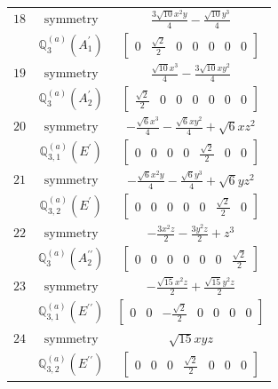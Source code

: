 \documentclass[fleqn,8pt,landscape]{jsarticle}
\begin{document}
\begin{longtable}{ccc}
$ 18 $ & $ \text{symmetry} $ & $ \frac{3 \sqrt{10} x^{2} y}{4} - \frac{\sqrt{10} y^{3}}{4} $ \\
$  $ & $ \mathbb{Q}_{3}^{(a)}(A_{1}^{\prime}) $ & $ \begin{bmatrix} 0 & \frac{\sqrt{2}}{2} & 0 & 0 & 0 & 0 & 0 \end{bmatrix} $ \\ \hline
$ 19 $ & $ \text{symmetry} $ & $ \frac{\sqrt{10} x^{3}}{4} - \frac{3 \sqrt{10} x y^{2}}{4} $ \\
$  $ & $ \mathbb{Q}_{3}^{(a)}(A_{2}^{\prime}) $ & $ \begin{bmatrix} \frac{\sqrt{2}}{2} & 0 & 0 & 0 & 0 & 0 & 0 \end{bmatrix} $ \\ \hline
$ 20 $ & $ \text{symmetry} $ & $ - \frac{\sqrt{6} x^{3}}{4} - \frac{\sqrt{6} x y^{2}}{4} + \sqrt{6} x z^{2} $ \\
$  $ & $ \mathbb{Q}_{3,1}^{(a)}(E^{\prime}) $ & $ \begin{bmatrix} 0 & 0 & 0 & 0 & \frac{\sqrt{2}}{2} & 0 & 0 \end{bmatrix} $ \\ \hline
$ 21 $ & $ \text{symmetry} $ & $ - \frac{\sqrt{6} x^{2} y}{4} - \frac{\sqrt{6} y^{3}}{4} + \sqrt{6} y z^{2} $ \\
$  $ & $ \mathbb{Q}_{3,2}^{(a)}(E^{\prime}) $ & $ \begin{bmatrix} 0 & 0 & 0 & 0 & 0 & \frac{\sqrt{2}}{2} & 0 \end{bmatrix} $ \\ \hline
$ 22 $ & $ \text{symmetry} $ & $ - \frac{3 x^{2} z}{2} - \frac{3 y^{2} z}{2} + z^{3} $ \\
$  $ & $ \mathbb{Q}_{3}^{(a)}(A_{2}^{\prime\prime}) $ & $ \begin{bmatrix} 0 & 0 & 0 & 0 & 0 & 0 & \frac{\sqrt{2}}{2} \end{bmatrix} $ \\ \hline
$ 23 $ & $ \text{symmetry} $ & $ - \frac{\sqrt{15} x^{2} z}{2} + \frac{\sqrt{15} y^{2} z}{2} $ \\
$  $ & $ \mathbb{Q}_{3,1}^{(a)}(E^{\prime\prime}) $ & $ \begin{bmatrix} 0 & 0 & - \frac{\sqrt{2}}{2} & 0 & 0 & 0 & 0 \end{bmatrix} $ \\ \hline
$ 24 $ & $ \text{symmetry} $ & $ \sqrt{15} x y z $ \\
$  $ & $ \mathbb{Q}_{3,2}^{(a)}(E^{\prime\prime}) $ & $ \begin{bmatrix} 0 & 0 & 0 & \frac{\sqrt{2}}{2} & 0 & 0 & 0 \end{bmatrix} $ \\ \hline

\end{longtable}
\end{document}
